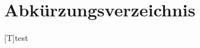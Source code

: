\tableofcontents
\pagebreak

\section{Abkürzungsverzeichnis}

\begin{acronym}
    [T]{test}
\end{acronym}

\pagebreak

\listoffigures

\pagebreak